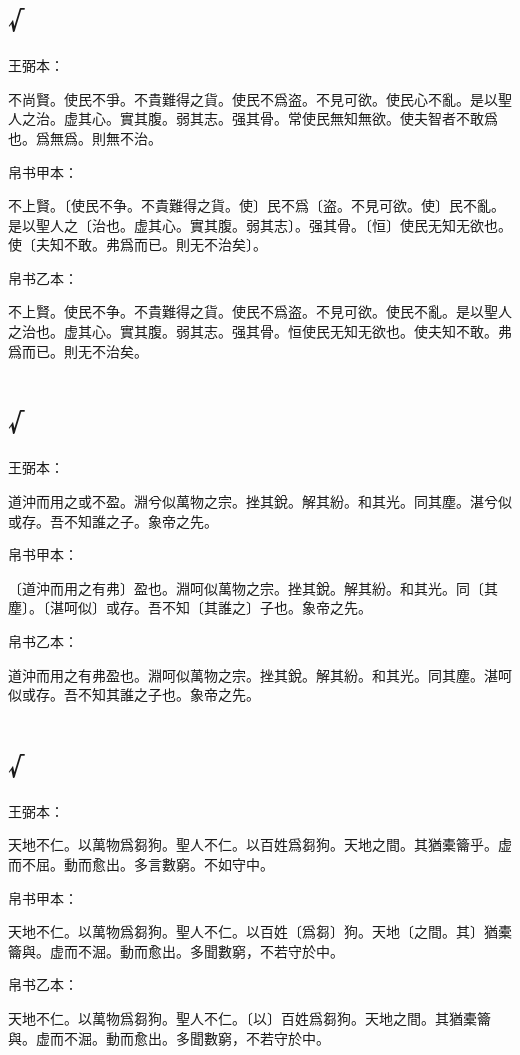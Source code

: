 \documentclass[a5paper]{ctexbook}
\begin{document}
    \chapter{√}
    王弼本：

    不尚賢。使民不爭。不貴難得之貨。使民不爲盗。不見可欲。使民心不亂。是以聖人之治。虚其心。實其腹。弱其志。强其骨。常使民無知無欲。使夫智者不敢爲也。爲無爲。則無不治。

    
    帛书甲本：

    不上賢。〔使民不争。不貴難得之貨。使〕民不爲〔盗。不見可欲。使〕民不亂。是以聖人之〔治也。虚其心。實其腹。弱其志〕。强其骨。〔恒〕使民无知无欲也。使〔夫知不敢。弗爲而已。則无不治矣〕。

    帛书乙本：

    不上賢。使民不争。不貴難得之貨。使民不爲盗。不見可欲。使民不亂。是以聖人之治也。虚其心。實其腹。弱其志。强其骨。恒使民无知无欲也。使夫知不敢。弗爲而已。則无不治矣。

    \chapter{√}
    王弼本：

    道沖而用之或不盈。淵兮似萬物之宗。挫其銳。解其紛。和其光。同其塵。湛兮似或存。吾不知誰之子。象帝之先。

    
    帛书甲本：

    〔道沖而用之有弗〕盈也。淵呵似萬物之宗。挫其銳。解其紛。和其光。同〔其塵〕。〔湛呵似〕或存。吾不知〔其誰之〕子也。象帝之先。

    帛书乙本：

    道沖而用之有弗盈也。淵呵似萬物之宗。挫其銳。解其紛。和其光。同其塵。湛呵似或存。吾不知其誰之子也。象帝之先。

    \chapter{√}
    王弼本：

    天地不仁。以萬物爲芻狗。聖人不仁。以百姓爲芻狗。天地之間。其猶橐籥乎。虚而不屈。動而愈出。多言數窮。不如守中。

    
    帛书甲本：

    天地不仁。以萬物爲芻狗。聖人不仁。以百姓〔爲芻〕狗。天地〔之間。其〕猶橐籥與。虚而不淈。動而愈出。多聞數窮，不若守於中。

    帛书乙本：

    天地不仁。以萬物爲芻狗。聖人不仁。〔以〕百姓爲芻狗。天地之間。其猶橐籥與。虚而不淈。動而愈出。多聞數窮，不若守於中。
\end{document}
